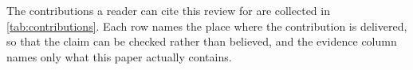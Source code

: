 
The contributions a reader can cite this review for are collected in \cref{tab:contributions}. Each row
names the place where the contribution is delivered, so that the claim can be checked rather than
believed, and the evidence column names only what this paper actually contains.

